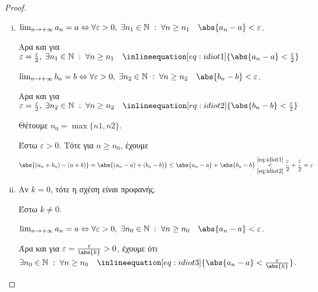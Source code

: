 \documentclass[main.tex]{subfiles}
\begin{document}
\begin{proof}
\item {}
    \begin{enumerate}[i)]
        \item $ \lim_{n \to +\infty} a_{n} = a \Leftrightarrow \forall 
            \varepsilon > 0, \; \exists n_{1} \in \mathbb{N} \; : \; 
            \forall n \geq n_{1} \quad \abs{a_{n}-a} < \varepsilon$.

            Αρα και για $ \varepsilon = \frac{\varepsilon}{ 2}, \; 
            \exists n_{1} \in \mathbb{N} \; : \; \forall n \geq n_{1} 
            \quad \inlineequation[eq:idiot1]{\abs{a_{n}-a} <
            \frac{\varepsilon}{2}} $

            $ \lim_{n \to +\infty} b_{n} = b \Leftrightarrow \forall 
            \varepsilon > 0, \; \exists n_{2} \in \mathbb{N} \; : \; 
            \forall n \geq n_{2} \quad \abs{b_{n}-b} < \varepsilon$.

            Αρα και για $ \varepsilon = \frac{\varepsilon}{ 2}, \; 
            \exists n_{2} \in \mathbb{N} \; : \; \forall n \geq n_{2} 
            \quad \inlineequation[eq:idiot2]{\abs{b_{n}-b} <
            \frac{\varepsilon}{2}} $

            Θέτουμε $ n_{0}= \max \{ n1,n2 \} $.

            Έστω $ \varepsilon >0 $. Τότε για $ n \geq n_{0} $, έχουμε 
            \[
                \abs{(a_{n}+ b_{n}) - (a+b)} = \abs{(a_{n}- a) + 
                (b_{n}-b)} \leq \abs{a_{n}- a} + \abs{b_{n}-b} 
                \overset{\eqref{eq:idiot1}}
                {\underset{\eqref{eq:idiot2}}{<}} 
                \frac{\varepsilon }{2} + \frac{\varepsilon}{ 2} = 
                \varepsilon
            \] 

        \item 
            Αν $ k=0 $, τότε η σχέση είναι προφανής.

            Έστω $ k \neq 0 $. 

            $ \lim_{n \to +\infty} a_{n} = a \Leftrightarrow \forall 
            \varepsilon >0, \; \exists 
            n_{0} \in \mathbb{N} \; : \; \forall n \geq n_{0} \quad 
            \abs{a_{n}- a} < \varepsilon$. 

            Άρα και για $ \varepsilon = \frac{\varepsilon}{\abs{k}} >0$,
            έχουμε ότι $ \exists n_{0} \in \mathbb{N} \; : \; 
            \forall n \geq n_{0} \quad \inlineequation[eq:idiot3]
            {\abs{a_{n}- a} < \frac{\varepsilon}{\abs{k}}}$. 


\end{enumerate}
\end{proof}
\end{document}
